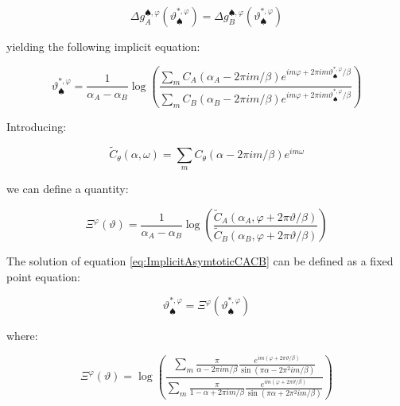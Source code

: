 \documentclass{article}
\theoremstyle{definition}
\begin{document}
\begin{equation}
    \Delta g_A^{\spadesuit,\varphi}(\vartheta^{*,\varphi}_\spadesuit) = \Delta g_B^{\spadesuit,\varphi}(\vartheta^{*,\varphi}_\spadesuit)
\end{equation}

yielding the following implicit equation:

\begin{equation}
\label{eq:ImplicitAsymtoticCACB}
    \vartheta^{*,\varphi}_\spadesuit = 
    \frac{1}{\alpha_A - \alpha_B} \log \left (
    \frac{
    \sum_m C_A(\alpha_A - 2 \pi i m/\beta) e^{i m \varphi + 2 \pi i m \vartheta^{*,\varphi}_\spadesuit / \beta }
    }
    {
    \sum_m C_B(\alpha_B - 2 \pi i m/\beta) e^{i m \varphi + 2 \pi i m \vartheta^{*,\varphi}_\spadesuit / \beta }
    }
    \right )
\end{equation}

Introducing:

\begin{equation}
    \widetilde{C}_\theta(\alpha,\omega) = 
    \sum_m C_\theta(\alpha - 2 \pi i m/\beta) e^{i m \omega}
\end{equation}

we can define a quantity:

\begin{equation}
    \Xi^\varphi(\vartheta) = 
    \frac{1}{\alpha_A - \alpha_B} \log \left (
    \frac{
    \widetilde{C}_A(\alpha_A,\varphi + 2 \pi \vartheta / \beta )
    }
    {
    \widetilde{C}_B(\alpha_B,\varphi + 2 \pi \vartheta / \beta )
    }
    \right )
\end{equation}

The solution of equation \eqref{eq:ImplicitAsymtoticCACB} can be defined as a fixed point equation:

\begin{equation}
\label{eq:AsymptoticBayesianLogOdds01}
\boxed{
    \vartheta^{*,\varphi}_\spadesuit = 
    \Xi^\varphi(\vartheta^{*,\varphi}_\spadesuit)
    }
\end{equation}

where:

\begin{equation}
\label{eq:AsymptoticBayesianLogOdds02}
    \Xi^\varphi(\vartheta) = 
    \log \left (
    \frac{
    \sum_m \frac{\pi}{\alpha - 2 \pi i m /\beta} \frac{
    e^{i m (\varphi + 2 \pi \vartheta / \beta) }}
    {\sin(\pi \alpha - 2 \pi^2 i m /\beta)} 
    }
    {
    \sum_m \frac{\pi}{1-\alpha + 2 \pi i m /\beta} \frac{
    e^{i m (\varphi + 2 \pi \vartheta / \beta) }}
    {\sin(\pi \alpha + 2 \pi^2 i m /\beta)} 
    }
    \right )
\end{equation}
\end{document}
